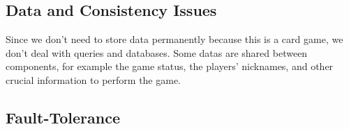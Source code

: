 \documentclass{scrartcl}
\begin{document}
\subsection{Data and Consistency
Issues}\label{data-and-consistency-issues}

Since we don't need to store data permanently because this is a card game, we don't deal with queries and databases. \newline
Some datas are shared between components, for example the game status, the players' nicknames, and other crucial information to perform the game. \newline

\subsection{Fault-Tolerance}\label{fault-tolerance}


\end{document}
